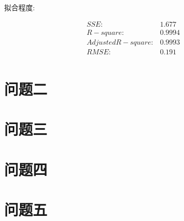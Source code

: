 \documentclass[UTF8]{ctexart}
\begin{document}
			\begin{flushleft}
				拟合程度:
			\end{flushleft}
			\begin{center}
				$$
				\begin{matrix}
				SSE:&1.677\\
				R-square:&0.9994\\
				Adjusted R-square:&0.9993\\
				RMSE:&0.191\\
				\end{matrix}
				$$
			\end{center}
		\section{问题二}
		\section{问题三}
		\section{问题四}
		\section{问题五}
\end{document}
